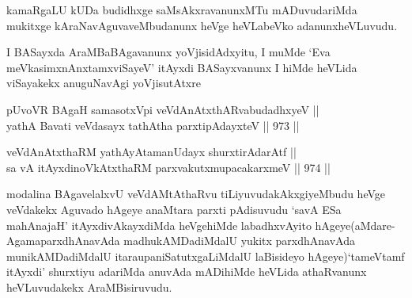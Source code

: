 \begin{artha}
kamaRgaLU kUDa budidhxge saMsAkxravanunxMTu mADuvudariMda mukitxge kAraNavAguvaveMbudanunx heVge heVLabeVko adanunx\break heVLuvudu.
\end{artha}

\begin{artha}
I BASayxda AraMBaBAgavanunx yoVjisidAdxyitu, I muMde `Eva meVkasimxnAnxtamxviSayeV\mdash  ' itAyxdi BASayxvanunx I hiMde heVLida viSayakekx anuguNavAgi yoVjisutAtxre\ndash 
\end{artha}

\begin{shl}
pUvoVR BAgaH samasotxV\s pi veVdAnAtxthARvabudadhxyeV || \\
yathA Bavati veVdasayx tathA\s tha parxtipAdayxteV \hfill || 973 ||  
\end{shl}
				
\begin{shl}
veVdAnAtxthaRM yathAyAtamanUdayx shurxtirAdarAtf || \\
sa vA itAyxdinoVkAtxthaRM parxvakutxmupacakarxmeV \hfill || 974 ||  
\end{shl}


\begin{artha}
modalina BAgavelalxvU veVdAMtAthaRvu tiLiyuvudakAkxgi\-\break yeMbudu heVge veVdakekx Aguvado hAgeye anaMtara parxti pAdisuvudu `savA ESa mahAnajaH' itAyxdivAkayxdiMda heVgehiMde labadhxvAyito hAgeye(aMdare- AgamaparxdhAnavAda madhukAMDadiMdalU yukitx parxdhAnavAda munikAMDadiMdalU itara\break upaniSatutxgaLiMdalU laBisideyo hAgeye)`tameVtamf itAyxdi' shurxtiyu adariMda anuvAda mADihiMde heVLida athaRvanunx heVLuvudakekx AraMBisiruvudu.
\end{artha}



